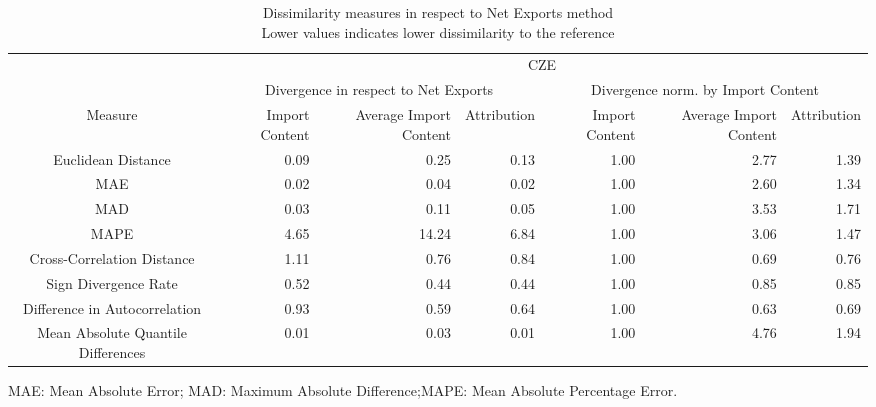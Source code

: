 \begin{table}[t]
\caption*{
{\large Dissimilarity measures in respect to Net Exports method} \\ 
{\small Lower values indicates lower dissimilarity to the reference}
} 
\fontsize{15.0pt}{18.0pt}\selectfont
\begin{tabular*}{\linewidth}{@{\extracolsep{\fill}}crrrrrr}
\toprule
 & \multicolumn{6}{c}{CZE} \\ 
\cmidrule(lr){2-7}
 & \multicolumn{3}{c}{Divergence in respect to Net Exports} & \multicolumn{3}{c}{Divergence norm. by Import Content} \\ 
\cmidrule(lr){2-4} \cmidrule(lr){5-7}
Measure & Import Content & Average Import Content & Attribution & Import Content & Average Import Content & Attribution \\ 
\midrule\addlinespace[2.5pt]
Euclidean Distance & 0.09 & 0.25 & 0.13 & 1.00 & 2.77 & 1.39 \\ 
MAE & 0.02 & 0.04 & 0.02 & 1.00 & 2.60 & 1.34 \\ 
MAD & 0.03 & 0.11 & 0.05 & 1.00 & 3.53 & 1.71 \\ 
MAPE & 4.65 & 14.24 & 6.84 & 1.00 & 3.06 & 1.47 \\ 
Cross-Correlation Distance & 1.11 & 0.76 & 0.84 & 1.00 & 0.69 & 0.76 \\ 
Sign Divergence Rate & 0.52 & 0.44 & 0.44 & 1.00 & 0.85 & 0.85 \\ 
Difference in Autocorrelation & 0.93 & 0.59 & 0.64 & 1.00 & 0.63 & 0.69 \\ 
Mean Absolute Quantile Differences & 0.01 & 0.03 & 0.01 & 1.00 & 4.76 & 1.94 \\ 
\bottomrule
\end{tabular*}
\begin{minipage}{\linewidth}
MAE: Mean Absolute Error; MAD: Maximum Absolute Difference;MAPE: Mean Absolute Percentage Error.\\
\end{minipage}
\end{table}

